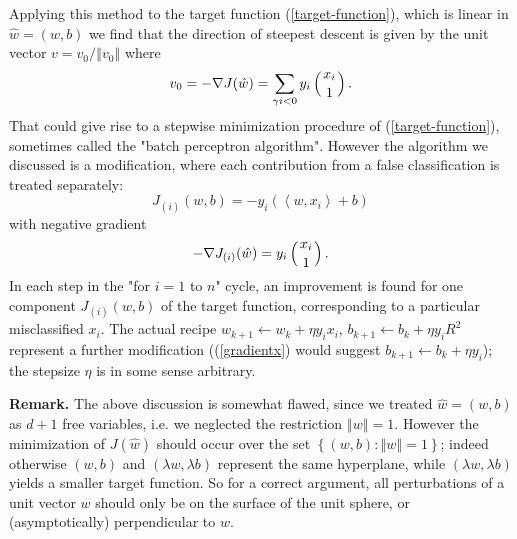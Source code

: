 \documentclass[11pt,twoside]{article}%
\theoremstyle{change}
\begin{document}
Applying this method to the target function (\ref{target-function}), which is
linear in $\hat{w}=\left(  w,b\right)  $ we find that the direction of
steepest descent is given by the unit vector $v=v_{0}/\left\Vert
v_{0}\right\Vert $ where
\[
v_{0}=-\nabla J(\hat{w})=\sum_{\gamma i<0}y_{i}\left(
\genfrac{}{}{0pt}{}{x_{i}}{1}%
\right)  .
\]
That could give rise to a stepwise minimization procedure of
(\ref{target-function}), sometimes called the "batch perceptron algorithm".
However the algorithm we discussed is a modification, where each contribution
from a false classification is treated separately:
\[
J_{(i)}(w,b)=-y_{i}\left(  \left\langle w,x_{i}\right\rangle +b\right)
\]
with negative gradient
\begin{equation}
-\nabla J_{(i)}(\hat{w})=y_{i}\left(
\genfrac{}{}{0pt}{}{x_{i}}{1}%
\right)  .\label{gradientx}%
\end{equation}
In each step in the "for $i=1$ to $n$" cycle, an improvement is found for one
component $J_{(i)}(w,b)$ of the target function, corresponding to a particular
misclassified $x_{i}$. The actual recipe $w_{k+1}\leftarrow w_{k}+\eta
y_{i}x_{i}$, $b_{k+1}\leftarrow b_{k}+\eta y_{i}R^{2}$ represent a further
modification ((\ref{gradientx}) would suggest $b_{k+1}\leftarrow b_{k}+\eta
y_{i}$); the stepsize $\eta$ is in some sense arbitrary.

\textbf{Remark.} The above discussion is somewhat flawed, since we treated
$\hat{w}=(w,b)$ as $d+1$ free variables, i.e. we neglected the restriction
$\left\Vert w\right\Vert =1$. However the minimization of $J(\hat{w})$ should
occur over the set $\left\{  (w,b):\left\Vert w\right\Vert =1\right\}  $;
indeed otherwise $(w,b)$ and $(\lambda w,\lambda b)$ represent the same
hyperplane, while $(\lambda w,\lambda b)$ yields a smaller target function. So
for a correct argument, all perturbations of a unit vector $w$ should only be
on the surface of the unit sphere, or (asymptotically) perpendicular to $w.$%
\end{document}
